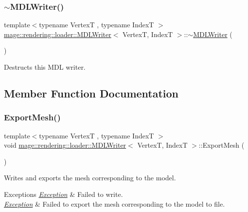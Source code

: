 \subsubsection{\texorpdfstring{$\sim$\+M\+D\+L\+Writer()}{~MDLWriter()}}
{\footnotesize\ttfamily template$<$typename VertexT , typename IndexT $>$ \\
\mbox{\hyperlink{classmage_1_1rendering_1_1loader_1_1_m_d_l_writer}{mage\+::rendering\+::loader\+::\+M\+D\+L\+Writer}}$<$ VertexT, IndexT $>$\+::$\sim$\mbox{\hyperlink{classmage_1_1rendering_1_1loader_1_1_m_d_l_writer}{M\+D\+L\+Writer}} (\begin{DoxyParamCaption}{ }\end{DoxyParamCaption})}

Destructs this M\+DL writer. 

\subsection{Member Function Documentation}
\mbox{\label{classmage_1_1rendering_1_1loader_1_1_m_d_l_writer_a77189702168fc4ea6b9482a9efec788f}} 
\subsubsection{\texorpdfstring{Export\+Mesh()}{ExportMesh()}}
{\footnotesize\ttfamily template$<$typename VertexT , typename IndexT $>$ \\
void \mbox{\hyperlink{classmage_1_1rendering_1_1loader_1_1_m_d_l_writer}{mage\+::rendering\+::loader\+::\+M\+D\+L\+Writer}}$<$ VertexT, IndexT $>$\+::Export\+Mesh (\begin{DoxyParamCaption}{ }\end{DoxyParamCaption})\hspace{0.3cm}{\ttfamily [private]}}

Writes and exports the mesh corresponding to the model.


\begin{DoxyExceptions}{Exceptions}
{\em \mbox{\hyperlink{classmage_1_1_exception}{Exception}}} & Failed to write. \\
\hline
{\em \mbox{\hyperlink{classmage_1_1_exception}{Exception}}} & Failed to export the mesh corresponding to the model to file. \\
\hline
\end{DoxyExceptions}
\mbox{\label{classmage_1_1rendering_1_1loader_1_1_m_d_l_writer_a9e5f38a8b5016534385039d44d3d71dc}} 
